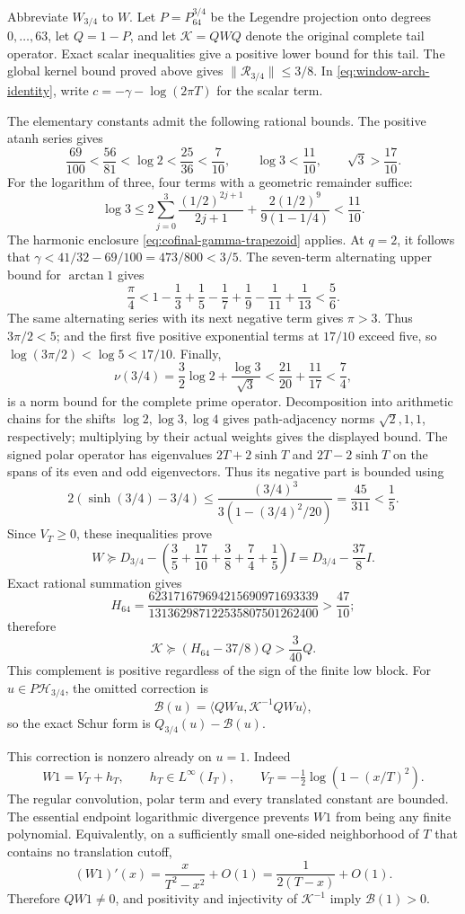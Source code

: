 Abbreviate $W_{3/4}$ to $W$.  Let $P=P_{64}^{3/4}$ be the Legendre projection onto degrees
$0,\ldots,63$, let $Q=1-P$, and let
$\mathcal K=QWQ$ denote the original complete tail operator.
Exact scalar inequalities give a positive lower bound for this tail.
The global kernel bound proved above gives
$\|\mathcal R_{3/4}\|\le3/8$.  In
\eqref{eq:window-arch-identity}, write
$c=-\gamma-\log(2\pi T)$ for the scalar term.

The elementary constants admit the following rational bounds.  The positive atanh series gives
\[
 \frac{69}{100}<\frac{56}{81}<\log2
       <\frac{25}{36}<\frac7{10},\qquad
 \log3<\frac{11}{10},\qquad \sqrt3>\frac{17}{10}.
\]
For the logarithm of three, four terms with a geometric
remainder suffice:
\[
 \log3\le2\sum_{j=0}^{3}\frac{(1/2)^{2j+1}}{2j+1}
       +\frac{2(1/2)^9}{9(1-1/4)}<\frac{11}{10}.
\]
The harmonic enclosure \eqref{eq:cofinal-gamma-trapezoid} applies.
At $q=2$, it follows that
$\gamma<41/32-69/100=473/800<3/5$.
The seven-term alternating upper bound for $\arctan1$ gives
\[
 \frac\pi4<1-\frac13+\frac15-\frac17
                    +\frac19-\frac1{11}+\frac1{13}<\frac56.
\]
The same alternating series with its next negative term gives
$\pi>3$.
Thus $3\pi/2<5$; and the first five positive exponential
terms at $17/10$ exceed five, so
$\log(3\pi/2)<\log5<17/10$.
Finally,
\[
 \nu(3/4)=\frac32\log2+\frac{\log3}{\sqrt3}
       <\frac{21}{20}+\frac{11}{17}<\frac74,
\]
is a norm bound for the complete prime operator.  Decomposition
into arithmetic chains for the shifts $\log2,\log3,\log4$
gives path-adjacency norms $\sqrt2,1,1$, respectively; multiplying
by their actual weights gives the displayed bound.  The signed
polar operator has eigenvalues $2T+2\sinh T$ and
$2T-2\sinh T$ on the spans of its even and odd eigenvectors.  Thus its
negative part is bounded using
\[
 2(\sinh(3/4)-3/4)
 \le\frac{(3/4)^3}{3(1-(3/4)^2/20)}
 =\frac{45}{311}<\frac15.
\]
Since $V_T\ge0$, these inequalities prove
\[
 W\succeq
 D_{3/4}-\left(\frac35+\frac{17}{10}+\frac38+\frac74+\frac15\right)I
 =D_{3/4}-\frac{37}{8}I.
\]
Exact rational summation gives
\[
 H_{64}=
 \frac{623171679694215690971693339}
      {131362987122535807501262400}>\frac{47}{10};
\]
therefore
\[
 \mathcal K\succeq(H_{64}-37/8)Q>\frac3{40}Q.
\]
This complement is positive regardless of the sign of the finite low block.
For $u\in P\mathcal H_{3/4}$,
the omitted correction is
\[
 \mathcal B(u)=\langle QWu,\mathcal K^{-1}QWu\rangle,
\]
so the exact Schur form is $Q_{3/4}(u)-\mathcal B(u)$.

This correction is nonzero already on $u=1$.  Indeed
\[
 W1=V_T+h_T,\qquad h_T\in L^\infty(I_T),\qquad
 V_T=-\tfrac12\log(1-(x/T)^2).
\]
The regular convolution, polar term and every translated
constant are bounded.  The essential endpoint logarithmic
divergence prevents $W1$ from being any finite polynomial.
Equivalently, on a sufficiently small one-sided neighborhood
of $T$ that contains no translation cutoff,
\[
 (W1)'(x)=\frac{x}{T^2-x^2}+O(1)
       =\frac1{2(T-x)}+O(1).
\]
Therefore $QW1\ne0$, and positivity and injectivity of
$\mathcal K^{-1}$ imply $\mathcal B(1)>0$.

